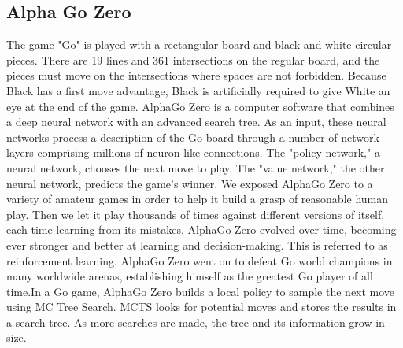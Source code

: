 \documentclass[10pt,twocolumn]{article}
\begin{document}
\subsection{Alpha Go Zero}
    The game "Go" is played with a rectangular board and black and white circular pieces. There are 19 lines and 361 intersections on the regular board, and the pieces must move on the intersections where spaces are not forbidden. Because Black has a first move advantage, Black is artificially required to give White an eye at the end of the game. AlphaGo Zero is a computer software that combines a deep neural network with an advanced search tree. As an input, these neural networks process a description of the Go board through a number of network layers comprising millions of neuron-like connections. The "policy network," a neural network, chooses the next move to play. The "value network," the other neural network, predicts the game's winner. We exposed AlphaGo Zero to a variety of amateur games in order to help it build a grasp of reasonable human play. Then we let it play thousands of times against different versions of itself, each time learning from its mistakes. AlphaGo Zero evolved over time, becoming ever stronger and better at learning and decision-making. This is referred to as reinforcement learning. AlphaGo Zero went on to defeat Go world champions in many worldwide arenas, establishing himself as the greatest Go player of all time.In a Go game, AlphaGo Zero builds a local policy to sample the next move using MC Tree Search. MCTS looks for potential moves and stores the results in a search tree. As more searches are made, the tree and its information grow in size. \cite{Surag}
    
    
\end{document}
